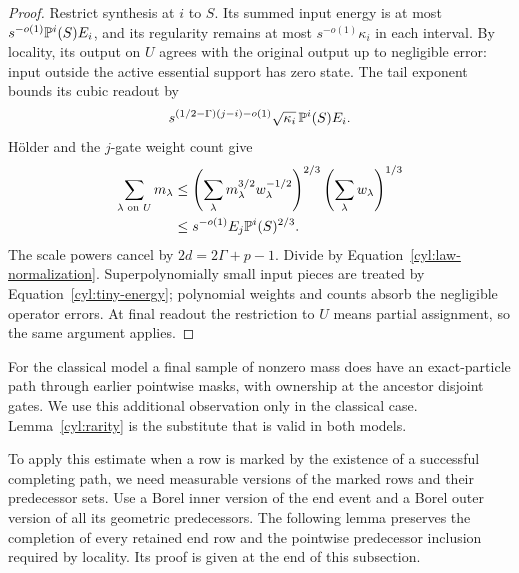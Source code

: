 \begin{proof}
Restrict synthesis at $i$ to $S$. Its summed input energy is at most
$s^{-o(1)}\mathbb P^i(S)E_i$, and its regularity remains at most
$s^{-o(1)}\kappa_i$ in each interval. By locality, its output on $U$
agrees with the original output up to negligible error: input outside
the active essential support has zero state. The tail
exponent bounds its cubic readout by
\[
 s^{(1/2-\Gamma)(j-i)-o(1)}
                 \sqrt{\kappa_i}\,\mathbb P^i(S)E_i.
\]
H\"older and the $j$-gate weight count give
\[
 \begin{split}
 \sum_{\lambda\text{ on }U}m_\lambda
 &\le
 \left(\sum_\lambda m_\lambda^{3/2}w_\lambda^{-1/2}\right)^{2/3}
 \left(\sum_\lambda w_\lambda\right)^{1/3}\\
 &\le s^{-o(1)}E_j\mathbb P^i(S)^{2/3}.
 \end{split}
\]
The scale powers cancel by $2d=2\Gamma+p-1$.
Divide by Equation~\eqref{cyl:law-normalization}.
Superpolynomially small input pieces are treated by
Equation~\eqref{cyl:tiny-energy}; polynomial weights and counts absorb
the negligible operator errors. At final readout the restriction to
$U$ means partial assignment, so the same argument applies.
\end{proof}

For the classical model a final sample of nonzero mass does have an
exact-particle path through earlier pointwise masks, with ownership at
the ancestor disjoint gates. We use this additional observation only
in the classical case. Lemma~\ref{cyl:rarity} is the substitute that
is valid in both models.

To apply this estimate when a row is marked by the existence of a
successful completing path, we need measurable versions of the marked
rows and their predecessor sets. Use a Borel inner version of the end
event and a Borel outer version of all its geometric predecessors.
The following lemma preserves the completion of every retained end row
and the pointwise predecessor inclusion required by locality. Its proof
is given at the end of this subsection.

